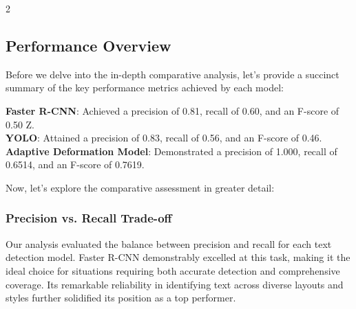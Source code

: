 \documentclass[sn-mathphys,Numbered]{sn-jnl}%
\begin{document}
\begin{multicols}{2}
\subsection{Performance Overview}

Before we delve into the in-depth comparative analysis, let's provide a succinct summary of the key performance metrics achieved by each model:

\textbf{Faster R-CNN}: Achieved a precision of 0.81, recall of 0.60, and an F-score of 0.50
Z. \\
\textbf{YOLO}: Attained a precision of 0.83, recall of 0.56, and an F-score of 0.46. \\
\textbf{Adaptive Deformation Model}: Demonstrated a precision of 1.000, recall of 0.6514, and an F-score of 0.7619.



Now, let's explore the comparative assessment in greater detail:

\subsubsection{Precision vs. Recall Trade-off}
Our analysis evaluated the balance between precision and recall for each text detection model. Faster R-CNN demonstrably excelled at this task, making it the ideal choice for situations requiring both accurate detection and comprehensive coverage. Its remarkable reliability in identifying text across diverse layouts and styles further solidified its position as a top performer.


\end{multicols}
\end{document}

